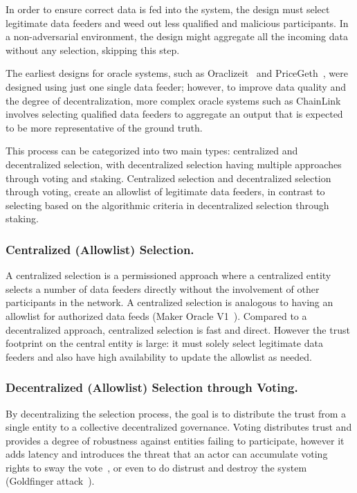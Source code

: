 In order to ensure correct data is fed into the system, the design must select legitimate data feeders and weed out less qualified and malicious participants. In a non-adversarial environment, the design might aggregate all the incoming data without any selection, skipping this step.

The earliest designs for oracle systems, such as Oraclizeit~\cite{bernanioraclize} and PriceGeth~\cite{eskandari2017feasibility}, were designed using just one single data feeder; however, to improve data quality and the degree of decentralization, more complex oracle systems such as ChainLink~\cite{ellis2017chainlink} involves selecting qualified data feeders to aggregate an output that is expected to be more representative of the ground truth.

This process can be categorized into two main types: centralized and decentralized selection, with decentralized selection having multiple approaches through voting and staking. Centralized selection and decentralized selection through voting, create an allowlist of legitimate data feeders, in contrast to selecting based on the algorithmic criteria in decentralized selection through staking. 

\subsubsection{Centralized (Allowlist) Selection.} A centralized selection is a permissioned approach where a centralized entity selects a number of data feeders directly without the involvement of other participants in the network. A centralized selection is analogous to having an allowlist for authorized data feeds (\eg Maker Oracle V1~\cite{MAKERDAOOracle}). 
Compared to a decentralized approach, centralized selection is fast and direct. However the trust footprint on the central entity is large: it must solely select legitimate data feeders and also have high availability to update the allowlist as needed.


\subsubsection{Decentralized (Allowlist) Selection through Voting.} By decentralizing the selection process, the goal is to distribute the trust from a single entity to a collective decentralized governance.
Voting distributes trust and provides a degree of robustness against entities failing to participate, however it adds latency and introduces the threat that an actor can accumulate voting rights to sway the vote~\cite{makerdaoflashloanattack}, or even to do distrust and destroy the system (\eg Goldfinger attack~\cite{kroll2013economics}). 

